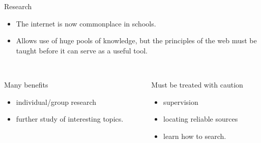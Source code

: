 \documentclass{beamer}
\begin{document}
\begin{frame}{Research}
    \begin{itemize}
        \item The internet is now commonplace in schools.
        \item Allows use of huge pools of knowledge, but the principles of the web must be taught before it can serve as a useful tool.\\~\\
    \end{itemize}
    \begin{columns}
        \pause
        \begin{column}[l]{5cm}
            Many benefits
            \begin{itemize}
                \item individual/group research
                \item further study of interesting topics.
            \end{itemize}
        \end{column}
        \pause
        \begin{column}[r]{5cm}
            Must be treated with caution
            \begin{itemize}
                \item supervision
                \item locating reliable sources
                \item learn how to search.
            \end{itemize}
        \end{column}
    \end{columns}
\end{frame}
\end{document}
